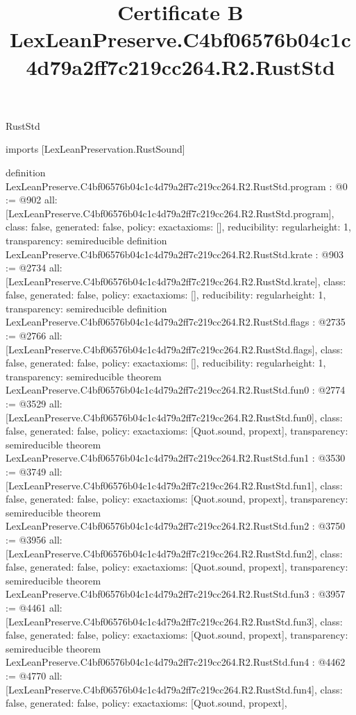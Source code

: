 \begin{lexlean}{RustStd}
\title{Certificate B LexLeanPreserve.C4bf06576b04c1c4d79a2ff7c219cc264.R2.RustStd}
\begin{coremodule}
imports [LexLeanPreservation.RustSound]

definition LexLeanPreserve.C4bf06576b04c1c4d79a2ff7c219cc264.R2.RustStd.program : @0 := @902 {
  all: [LexLeanPreserve.C4bf06576b04c1c4d79a2ff7c219cc264.R2.RustStd.program],
  class: false,
  generated: false,
  policy: exact{axioms: []},
  reducibility: regular{height: 1},
  transparency: semireducible
}
definition LexLeanPreserve.C4bf06576b04c1c4d79a2ff7c219cc264.R2.RustStd.krate : @903 := @2734 {
  all: [LexLeanPreserve.C4bf06576b04c1c4d79a2ff7c219cc264.R2.RustStd.krate],
  class: false,
  generated: false,
  policy: exact{axioms: []},
  reducibility: regular{height: 1},
  transparency: semireducible
}
definition LexLeanPreserve.C4bf06576b04c1c4d79a2ff7c219cc264.R2.RustStd.flags : @2735 := @2766 {
  all: [LexLeanPreserve.C4bf06576b04c1c4d79a2ff7c219cc264.R2.RustStd.flags],
  class: false,
  generated: false,
  policy: exact{axioms: []},
  reducibility: regular{height: 1},
  transparency: semireducible
}
theorem LexLeanPreserve.C4bf06576b04c1c4d79a2ff7c219cc264.R2.RustStd.fun0 : @2774 := @3529 {
  all: [LexLeanPreserve.C4bf06576b04c1c4d79a2ff7c219cc264.R2.RustStd.fun0],
  class: false,
  generated: false,
  policy: exact{axioms: [Quot.sound, propext]},
  transparency: semireducible
}
theorem LexLeanPreserve.C4bf06576b04c1c4d79a2ff7c219cc264.R2.RustStd.fun1 : @3530 := @3749 {
  all: [LexLeanPreserve.C4bf06576b04c1c4d79a2ff7c219cc264.R2.RustStd.fun1],
  class: false,
  generated: false,
  policy: exact{axioms: [Quot.sound, propext]},
  transparency: semireducible
}
theorem LexLeanPreserve.C4bf06576b04c1c4d79a2ff7c219cc264.R2.RustStd.fun2 : @3750 := @3956 {
  all: [LexLeanPreserve.C4bf06576b04c1c4d79a2ff7c219cc264.R2.RustStd.fun2],
  class: false,
  generated: false,
  policy: exact{axioms: [Quot.sound, propext]},
  transparency: semireducible
}
theorem LexLeanPreserve.C4bf06576b04c1c4d79a2ff7c219cc264.R2.RustStd.fun3 : @3957 := @4461 {
  all: [LexLeanPreserve.C4bf06576b04c1c4d79a2ff7c219cc264.R2.RustStd.fun3],
  class: false,
  generated: false,
  policy: exact{axioms: [Quot.sound, propext]},
  transparency: semireducible
}
theorem LexLeanPreserve.C4bf06576b04c1c4d79a2ff7c219cc264.R2.RustStd.fun4 : @4462 := @4770 {
  all: [LexLeanPreserve.C4bf06576b04c1c4d79a2ff7c219cc264.R2.RustStd.fun4],
  class: false,
  generated: false,
  policy: exact{axioms: [Quot.sound, propext]},
}
\end{coremodule}
\end{lexlean}
